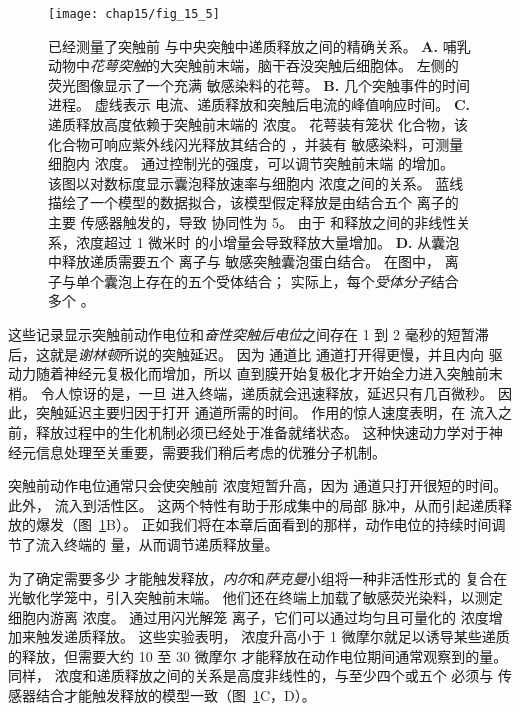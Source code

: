 \begin{figure}[htbp]
	\centering
	\texttt{[image: chap15/fig\_15\_5]}
	\caption{已经测量了突触前  与中央突触中递质释放之间的精确关系\cite{meinrenken2003hodgkin,sun2007dual}。
	\textbf{A.} 哺乳动物中\textit{花萼突触}的大突触前末端，脑干吞没突触后细胞体。
	左侧的荧光图像显示了一个充满  敏感染料的花萼。
	\textbf{B.} 几个突触事件的时间进程。
	虚线表示  电流、递质释放和突触后电流的峰值响应时间。
	\textbf{C.} 递质释放高度依赖于突触前末端的  浓度。
	花萼装有笼状  化合物，该化合物可响应紫外线闪光释放其结合的 ，并装有  敏感染料，可测量细胞内  浓度。
	通过控制光的强度，可以调节突触前末端  的增加。
	该图以对数标度显示囊泡释放速率与细胞内  浓度之间的关系。
	蓝线描绘了一个模型的数据拟合，该模型假定释放是由结合五个  离子的主要  传感器触发的，导致  协同性为 5。
	由于  和释放之间的非线性关系，浓度超过 1 微米时  的小增量会导致释放大量增加。
	\textbf{D.} 从囊泡中释放递质需要五个  离子与  敏感突触囊泡蛋白结合。
	在图中， 离子与单个囊泡上存在的五个受体结合；
	实际上，每个\textit{受体分子}结合多个 。}
	\label{fig:15_5}
\end{figure}


这些记录显示突触前动作电位和\textit{奋性突触后电位}之间存在 1 到 2 毫秒的短暂滞后，这就是\textit{谢林顿}所说的突触延迟。
因为  通道比  通道打开得更慢，并且内向  驱动力随着神经元复极化而增加，所以  直到膜开始复极化才开始全力进入突触前末梢。
令人惊讶的是，一旦  进入终端，递质就会迅速释放，延迟只有几百微秒。
因此，突触延迟主要归因于打开  通道所需的时间。
 作用的惊人速度表明，在  流入之前，释放过程中的生化机制必须已经处于准备就绪状态。 
这种快速动力学对于神经元信息处理至关重要，需要我们稍后考虑的优雅分子机制。


突触前动作电位通常只会使突触前  浓度短暂升高，因为  通道只打开很短的时间。 
此外， 流入到活性区。
这两个特性有助于形成集中的局部  脉冲，从而引起递质释放的爆发（图~\ref{fig:15_5}B）。
正如我们将在本章后面看到的那样，动作电位的持续时间调节了流入终端的  量，从而调节递质释放量。


为了确定需要多少  才能触发释放，\textit{内尔}和\textit{萨克曼}小组将一种非活性形式的  复合在光敏化学笼中，引入突触前末端。
他们还在终端上加载了敏感荧光染料，以测定细胞内游离  浓度。
通过用闪光解笼  离子，它们可以通过均匀且可量化的  浓度增加来触发递质释放。
这些实验表明， 浓度升高小于 1 微摩尔就足以诱导某些递质的释放，但需要大约 10 至 30 微摩尔  才能释放在动作电位期间通常观察到的量。
同样， 浓度和递质释放之间的关系是高度非线性的，与至少四个或五个  必须与  传感器结合才能触发释放的模型一致（图~\ref{fig:15_5}C，D）。



